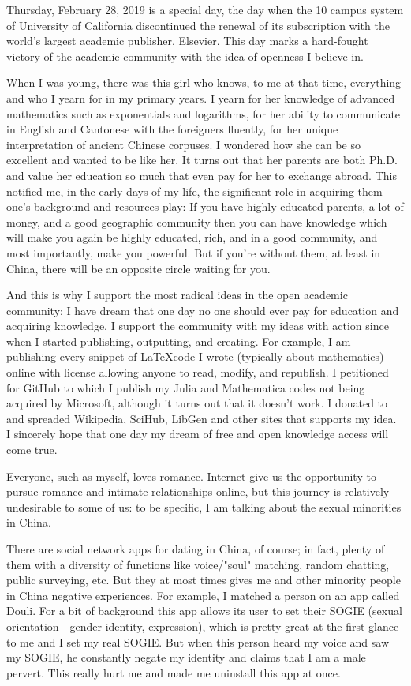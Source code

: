\documentclass[10pt]{article}
\begin{document}
\begin{CJK*}{UTF8}{gbsn}
\newpage
Thursday, February 28, 2019 is a special day, the day when the 10 campus system of University of California discontinued the renewal of its subscription with the world's largest academic publisher, Elsevier. This day marks a hard-fought victory of the academic community with the idea of openness I believe in.

When I was young, there was this girl who knows, to me at that time, everything and who I yearn for in my primary years. I yearn for her knowledge of advanced mathematics such as exponentials and logarithms, for her ability to communicate in English and Cantonese with the foreigners fluently, for her unique interpretation of ancient Chinese corpuses. I wondered how she can be so excellent and wanted to be like her. It turns out that her parents are both Ph.D. and value her education so much that even pay for her to exchange abroad. This notified me, in the early days of my life, the significant role in acquiring them one's background and resources play: If you have highly educated parents, a lot of money, and a good geographic community then you can have knowledge which will make you again be highly educated, rich, and in a good community, and most importantly, make you powerful. But if you're without them, at least in China, there will be an opposite circle waiting for you.

And this is why I support the most radical ideas in the open academic community: I have dream that one day no one should ever pay for education and acquiring knowledge. I support the community with my ideas with action since when I started publishing, outputting, and creating. For example, I am publishing every snippet of \LaTeX code I wrote (typically about mathematics) online with license allowing anyone to read, modify, and republish. I petitioned for GitHub to which I publish my Julia and Mathematica codes not being acquired by Microsoft, although it turns out that it doesn't work. I donated to and spreaded Wikipedia, SciHub, LibGen and other sites that supports my idea. I sincerely hope that one day my dream of free and open knowledge access will come true.

\newpage
Everyone, such as myself, loves romance. Internet give us the opportunity to pursue romance and intimate relationships online, but this journey is relatively undesirable to some of us: to be specific, I am talking about the sexual minorities in China.

There are social network apps for dating in China, of course; in fact, plenty of them with a diversity of functions like voice/"soul" matching, random chatting, public surveying, etc. But they at most times gives me and other minority people in China negative experiences. For example, I matched a person on an app called Douli. For a bit of background this app allows its user to set their SOGIE (sexual orientation - gender identity, expression), which is pretty great at the first glance to me and I set my real SOGIE. But when this person heard my voice and saw my SOGIE, he constantly negate my identity and claims that I am a male pervert. This really hurt me and made me uninstall this app at once.


\end{CJK*}
\end{document}
